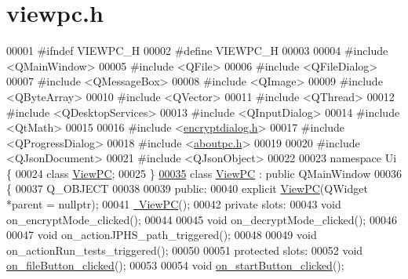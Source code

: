 \hypertarget{viewpc_8h_source}{\section{viewpc.\-h}
}

\begin{DoxyCode}
00001 \textcolor{preprocessor}{#ifndef VIEWPC\_H}
00002 \textcolor{preprocessor}{}\textcolor{preprocessor}{#define VIEWPC\_H}
00003 \textcolor{preprocessor}{}
00004 \textcolor{preprocessor}{#include <QMainWindow>}
00005 \textcolor{preprocessor}{#include <QFile>}
00006 \textcolor{preprocessor}{#include <QFileDialog>}
00007 \textcolor{preprocessor}{#include <QMessageBox>}
00008 \textcolor{preprocessor}{#include <QImage>}
00009 \textcolor{preprocessor}{#include <QByteArray>}
00010 \textcolor{preprocessor}{#include <QVector>}
00011 \textcolor{preprocessor}{#include <QThread>}
00012 \textcolor{preprocessor}{#include <QDesktopServices>}
00013 \textcolor{preprocessor}{#include <QInputDialog>}
00014 \textcolor{preprocessor}{#include <QtMath>}
00015 
00016 \textcolor{preprocessor}{#include <\hyperlink{encryptdialog_8h}{encryptdialog.h}>}
00017 \textcolor{preprocessor}{#include <QProgressDialog>}
00018 \textcolor{preprocessor}{#include <\hyperlink{aboutpc_8h}{aboutpc.h}>}
00019 
00020 \textcolor{preprocessor}{#include <QJsonDocument>}
00021 \textcolor{preprocessor}{#include <QJsonObject>}
00022 
00023 \textcolor{keyword}{namespace }Ui \{
00024 \textcolor{keyword}{class }\hyperlink{class_view_p_c}{ViewPC};
00025 \}
\hypertarget{viewpc_8h_source_l00035}{}\hyperlink{class_view_p_c}{00035} \textcolor{keyword}{class }\hyperlink{class_view_p_c}{ViewPC} : \textcolor{keyword}{public} QMainWindow
00036 \{
00037     Q\_OBJECT
00038 
00039 \textcolor{keyword}{public}:
00040     \textcolor{keyword}{explicit} \hyperlink{class_view_p_c_a33c96c61f61042319c66c19059836b7f}{ViewPC}(QWidget *parent = \textcolor{keyword}{nullptr});
00041     \hyperlink{class_view_p_c_a91c51f5c1e6ed5ab12b410339f469b0f}{~ViewPC}();
00042 \textcolor{keyword}{private} slots:
00043     \textcolor{keywordtype}{void} on\_encryptMode\_clicked();
00044 
00045     \textcolor{keywordtype}{void} on\_decryptMode\_clicked();
00046 
00047     \textcolor{keywordtype}{void} on\_actionJPHS\_path\_triggered();
00048 
00049     \textcolor{keywordtype}{void} on\_actionRun\_tests\_triggered();
00050 
00051 \textcolor{keyword}{protected} slots:
00052     \textcolor{keywordtype}{void} \hyperlink{class_view_p_c_a3b9b7a7be9702d8b160f257f1c74a776}{on\_fileButton\_clicked}();
00053 
00054     \textcolor{keywordtype}{void} \hyperlink{class_view_p_c_a456d75b7c5d3a089302a576e7359f1f4}{on\_startButton\_clicked}();

\end{DoxyCode}
